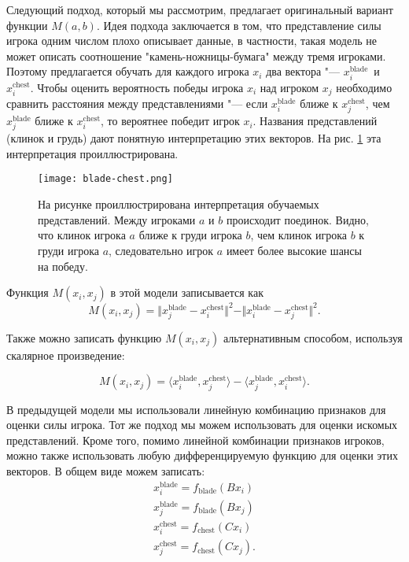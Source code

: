 \documentclass[12pt,a4paper]{article}
\begin{document}
Следующий подход, который мы рассмотрим, предлагает оригинальный вариант функции $M(a,b)$. Идея подхода заключается в том, что представление силы игрока одним числом плохо описывает данные, в частности, такая модель не может описать соотношение "камень-ножницы-бумага" между тремя игроками. Поэтому предлагается обучать для каждого игрока $x_i$ два вектора "--- $x_i^{\text{blade}}$~и~$x_i^{\text{chest}}$. Чтобы оценить вероятность победы игрока $x_i$ над игроком $x_j$ необходимо сравнить расстояния между представлениями "--- если $x_i^{\text{blade}}$ ближе к $x_j^{\text{chest}}$, чем $x_j^{\text{blade}}$ ближе к $x_i^{\text{chest}}$, то вероятнее победит игрок $x_i$. Названия представлений (клинок и грудь) дают понятную интерпретацию этих векторов. На рис. \ref{blade-chest} эта интерпретация проиллюстрирована.

\begin{figure}[h!]
\centering
\texttt{[image: blade-chest.png]}
\caption{На рисунке проиллюстрирована интерпретация обучаемых представлений. Между игроками $a$ и $b$ происходит поединок. Видно, что клинок игрока $a$ ближе к груди игрока $b$, чем клинок игрока $b$ к груди игрока $a$, следовательно игрок $a$ имеет более высокие шансы на победу.}
\label{blade-chest}
\end{figure}

Функция $M(x_i,x_j)$ в этой модели записывается как
\begin{equation*}
	M(x_i, x_j) = \Vert x_j^{\text{blade}} - x_i^{\text{chest}} \Vert^2 - \Vert x_i^{\text{blade}} - x_j^{\text{chest}} \Vert^2.
\end{equation*}
\newpage

Также можно записать функцию $M(x_i,x_j)$ альтернативным способом, используя скалярное произведение:

\begin{equation*}
	M(x_i, x_j) = \langle x_i^{\text{blade}}, x_j^{\text{chest}} \rangle - \langle x_j^{\text{blade}}, x_i^{\text{chest}} \rangle.
\end{equation*}

В предыдущей модели мы использовали линейную комбинацию признаков для оценки силы игрока. Тот же подход мы можем использовать для оценки искомых представлений. Кроме того, помимо линейной комбинации признаков игроков, можно также использовать любую дифференцируемую функцию для оценки этих векторов. В общем виде можем записать:
\begin{align*}
	x_i^{\text{blade}} = f_{\text{blade}}(B x_i)\\
	x_j^{\text{blade}} = f_{\text{blade}}(B x_j)\\
	x_i^{\text{chest}} = f_{\text{chest}}(C x_i)\\
	x_j^{\text{chest}} = f_{\text{chest}}(C x_j).
\end{align*}
\end{document}
